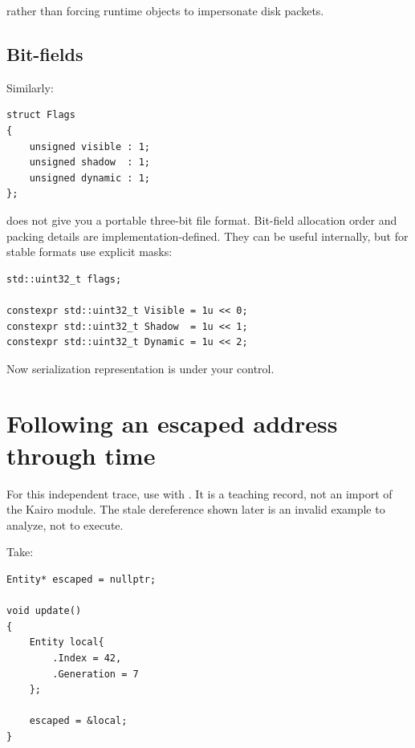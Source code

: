 rather than forcing runtime objects to impersonate disk packets.

\subsection{Bit-fields}\label{01-foundations-i-ch003-bit-fields}

\hypertarget{01-foundations-i-ch003-bit-fields}{}

Similarly:

\begin{verbatim}
struct Flags
{
    unsigned visible : 1;
    unsigned shadow  : 1;
    unsigned dynamic : 1;
};
\end{verbatim}

does not give you a portable three-bit file format. Bit-field allocation order and packing details are implementation-defined. They can be useful internally, but for stable formats use explicit masks:

\begin{verbatim}
std::uint32_t flags;

constexpr std::uint32_t Visible = 1u << 0;
constexpr std::uint32_t Shadow  = 1u << 1;
constexpr std::uint32_t Dynamic = 1u << 2;
\end{verbatim}

Now serialization representation is under your control.

\section{Following an escaped address through time}\label{01-foundations-i-ch003-following-an-escaped-address-through-time}

\hypertarget{01-foundations-i-ch003-following-an-escaped-address-through-time}{}

For this independent trace, use  with . It is a teaching record, not an import of the Kairo module. The stale dereference shown later is an invalid example to analyze, not to execute.

Take:

\begin{verbatim}
Entity* escaped = nullptr;

void update()
{
    Entity local{
        .Index = 42,
        .Generation = 7
    };

    escaped = &local;
}
\end{verbatim}

